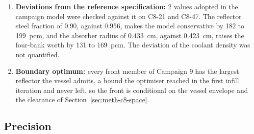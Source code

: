 \begin{enumerate}
  \item \textbf{Deviations from the reference specification:} 2
        values adopted in the campaign model were checked against it on
        C8-21 and C8-47. The reflector steel fraction of 0.90, against
        0.956, makes the model conservative by 182 to \SI{199}{pcm},
        and the absorber radius of \SI{0.433}{cm}, against
        \SI{0.423}{cm}, raises the four-bank worth by 131 to
        \SI{169}{pcm}. The deviation of the coolant density was not
        quantified.

  \item \textbf{Boundary optimum:} every front member of Campaign 9 has
        the largest reflector the vessel admits, a bound the optimiser
        reached in the first infill iteration and never left, so the
        front is conditional on the vessel envelope and the clearance
        of Section~\ref{sec:meth-c8-space}.
\end{enumerate}

\subsection{Precision}
\label{sec:res-uncertainty-precision}

